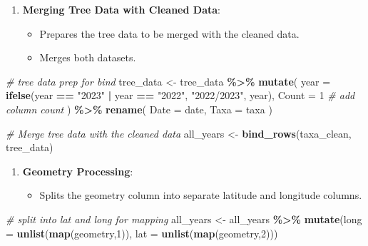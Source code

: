 \documentclass[
]{book}
\newenvironment{Shaded}{\begin{snugshade}}{\end{snugshade}}
\newcommand{\AttributeTok}[1]{\textcolor[rgb]{0.13,0.29,0.53}{#1}}
\newcommand{\CommentTok}[1]{\textcolor[rgb]{0.56,0.35,0.01}{\textit{#1}}}
\newcommand{\DecValTok}[1]{\textcolor[rgb]{0.00,0.00,0.81}{#1}}
\newcommand{\FunctionTok}[1]{\textcolor[rgb]{0.13,0.29,0.53}{\textbf{#1}}}
\newcommand{\NormalTok}[1]{#1}
\newcommand{\OtherTok}[1]{\textcolor[rgb]{0.56,0.35,0.01}{#1}}
\newcommand{\SpecialCharTok}[1]{\textcolor[rgb]{0.81,0.36,0.00}{\textbf{#1}}}
\newcommand{\StringTok}[1]{\textcolor[rgb]{0.31,0.60,0.02}{#1}}
\providecommand{\tightlist}{%
  \setlength{\itemsep}{0pt}\setlength{\parskip}{0pt}}
\theoremstyle{definition}
\theoremstyle{definition}
\theoremstyle{definition}
\theoremstyle{definition}
\theoremstyle{remark}
\begin{document}
\begin{enumerate}
\def\labelenumi{\arabic{enumi}.}
\setcounter{enumi}{7}
\tightlist
\item
  \textbf{Merging Tree Data with Cleaned Data}:

  \begin{itemize}
  \tightlist
  \item
    Prepares the tree data to be merged with the cleaned data.
  \item
    Merges both datasets.
  \end{itemize}
\end{enumerate}

\begin{Shaded}
\begin{Highlighting}[]
\CommentTok{\# tree data prep for bind}
\NormalTok{tree\_data }\OtherTok{\textless{}{-}}\NormalTok{ tree\_data }\SpecialCharTok{\%\textgreater{}\%}
  \FunctionTok{mutate}\NormalTok{(}
    \AttributeTok{year =} \FunctionTok{ifelse}\NormalTok{(year }\SpecialCharTok{==} \StringTok{"2023"} \SpecialCharTok{|}\NormalTok{ year }\SpecialCharTok{==} \StringTok{"2022"}\NormalTok{, }\StringTok{"2022/2023"}\NormalTok{, year),}
    \AttributeTok{Count =} \DecValTok{1} \CommentTok{\# add column count }
\NormalTok{  ) }\SpecialCharTok{\%\textgreater{}\%}
  \FunctionTok{rename}\NormalTok{(}
    \AttributeTok{Date =}\NormalTok{ date,}
    \AttributeTok{Taxa =}\NormalTok{ taxa}
\NormalTok{  )}

\CommentTok{\# Merge tree data with the cleaned data}
\NormalTok{all\_years }\OtherTok{\textless{}{-}} \FunctionTok{bind\_rows}\NormalTok{(taxa\_clean, tree\_data)}
\end{Highlighting}
\end{Shaded}

\begin{enumerate}
\def\labelenumi{\arabic{enumi}.}
\setcounter{enumi}{8}
\tightlist
\item
  \textbf{Geometry Processing}:

  \begin{itemize}
  \tightlist
  \item
    Splits the geometry column into separate latitude and longitude columns.
  \end{itemize}
\end{enumerate}

\begin{Shaded}
\begin{Highlighting}[]
\CommentTok{\# split into lat and long for mapping }
\NormalTok{all\_years }\OtherTok{\textless{}{-}}\NormalTok{ all\_years }\SpecialCharTok{\%\textgreater{}\%} \FunctionTok{mutate}\NormalTok{(}\AttributeTok{long =} \FunctionTok{unlist}\NormalTok{(}\FunctionTok{map}\NormalTok{(geometry,}\DecValTok{1}\NormalTok{)),}
           \AttributeTok{lat =} \FunctionTok{unlist}\NormalTok{(}\FunctionTok{map}\NormalTok{(geometry,}\DecValTok{2}\NormalTok{)))}
\end{Highlighting}
\end{Shaded}
\end{document}
